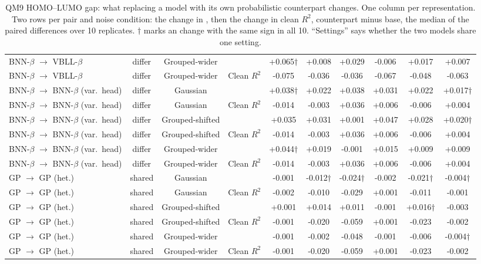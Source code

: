 \begin{table}[!htbp]
\begin{adjustbox}{max width=\textwidth,max totalheight=0.78\textheight}
\begin{tabular}{lccccccccc}
BNN-$\beta$ $\rightarrow$ VBLL-$\beta$ & differ & Grouped-wider & \aucnorm{} & +0.065$\dagger$ & +0.008 & +0.029 & -0.006 & +0.017 & +0.007 \\
BNN-$\beta$ $\rightarrow$ VBLL-$\beta$ & differ & Grouped-wider & Clean $R^2$ & -0.075 & -0.036 & -0.036 & -0.067 & -0.048 & -0.063 \\
BNN-$\beta$ $\rightarrow$ BNN-$\beta$ (var.\ head) & differ & Gaussian & \aucnorm{} & +0.038$\dagger$ & +0.022 & +0.038 & +0.031 & +0.022 & +0.017$\dagger$ \\
BNN-$\beta$ $\rightarrow$ BNN-$\beta$ (var.\ head) & differ & Gaussian & Clean $R^2$ & -0.014 & -0.003 & +0.036 & +0.006 & -0.006 & +0.004 \\
BNN-$\beta$ $\rightarrow$ BNN-$\beta$ (var.\ head) & differ & Grouped-shifted & \aucnorm{} & +0.035 & +0.031 & +0.001 & +0.047 & +0.028 & +0.020$\dagger$ \\
BNN-$\beta$ $\rightarrow$ BNN-$\beta$ (var.\ head) & differ & Grouped-shifted & Clean $R^2$ & -0.014 & -0.003 & +0.036 & +0.006 & -0.006 & +0.004 \\
BNN-$\beta$ $\rightarrow$ BNN-$\beta$ (var.\ head) & differ & Grouped-wider & \aucnorm{} & +0.044$\dagger$ & +0.019 & -0.001 & +0.015 & +0.009 & +0.009 \\
BNN-$\beta$ $\rightarrow$ BNN-$\beta$ (var.\ head) & differ & Grouped-wider & Clean $R^2$ & -0.014 & -0.003 & +0.036 & +0.006 & -0.006 & +0.004 \\
GP $\rightarrow$ GP (het.) & shared & Gaussian & \aucnorm{} & -0.001 & -0.012$\dagger$ & -0.024$\dagger$ & -0.002 & -0.021$\dagger$ & -0.004$\dagger$ \\
GP $\rightarrow$ GP (het.) & shared & Gaussian & Clean $R^2$ & -0.002 & -0.010 & -0.029 & +0.001 & -0.011 & -0.001 \\
GP $\rightarrow$ GP (het.) & shared & Grouped-shifted & \aucnorm{} & +0.001 & +0.014 & +0.011 & -0.001 & +0.016$\dagger$ & -0.003 \\
GP $\rightarrow$ GP (het.) & shared & Grouped-shifted & Clean $R^2$ & -0.001 & -0.020 & -0.059 & +0.001 & -0.023 & -0.002 \\
GP $\rightarrow$ GP (het.) & shared & Grouped-wider & \aucnorm{} & -0.001 & -0.002 & -0.048 & -0.001 & -0.006 & -0.004$\dagger$ \\
GP $\rightarrow$ GP (het.) & shared & Grouped-wider & Clean $R^2$ & -0.001 & -0.020 & -0.059 & +0.001 & -0.023 & -0.002 \\
\bottomrule
\end{tabular}
\end{adjustbox}
\caption[Change from each probabilistic counterpart on QM9.]{QM9 HOMO--LUMO gap: what replacing a model with its own probabilistic counterpart changes. One column per representation. Two rows per pair and noise condition: the change in \aucnorm, then the change in clean $R^2$, counterpart minus base, the median of the paired differences over 10 replicates. $\dagger$ marks an \aucnorm{} change with the same sign in all 10. ``Settings'' says whether the two models share one setting.}
\label{tab:counterparts}
\end{table}

